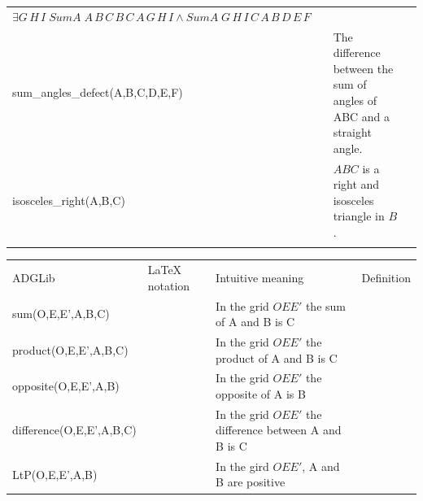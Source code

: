 \documentclass[a4wide,9pt,landscape]{article}
\begin{document}
\begin{tabularx}{270mm}{>{\ttfamily}llXX}
$\exists G\,H\,I\; SumA\; A\, B\, C\, B\, C\, A\, G\, H\, I \land SumA\; G\, H \,I\, C\, A\, B\, D\, E\, F $ \\
sum\_angles\_defect(A,B,C,D,E,F) & 
& 
The difference between the sum of angles of ABC and a straight angle. \\
\addlinespace
isosceles\_right(A,B,C) & 
& 
$ABC$ is a right and isosceles triangle in $B$. \\
\addlinespace
\bottomrule
\end{tabularx}

\newpage


\noindent\hspace{-75mm}
\begin{tabularx}{270mm}{>{\ttfamily}llXX}
\toprule
\multicolumn{4}{l}{\Huge Points-only; predicates on coordinates} \\ \midrule
ADGLib & 
\LaTeX{} notation & 
Intuitive meaning & 
Definition \\ \midrule
\addlinespace
sum(O,E,E',A,B,C) & & In the grid $OEE'$ the sum of A and B is C \\
product(O,E,E',A,B,C) & & In the grid $OEE'$ the product of A and B is C \\
opposite(O,E,E',A,B) & & In the grid $OEE'$ the opposite of A is B \\
difference(O,E,E',A,B,C) & & In the grid $OEE'$ the difference between A and B is C \\
LtP(O,E,E',A,B) & & In the gird $OEE'$, A and B are positive \\
\bottomrule
\end{tabularx}

\newpage

\end{document}
